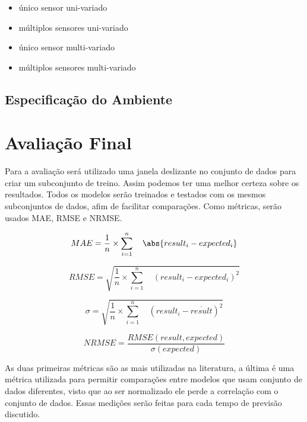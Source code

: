 \begin{itemize}
    \item único sensor uni-variado
    \item múltiplos sensores uni-variado
    \item único sensor multi-variado
    \item múltiplos sensores multi-variado
\end{itemize}

\subsection{Especificação do Ambiente}

\section{Avaliação Final}





Para a avaliação será utilizado uma janela deslizante no conjunto de dados para criar um subconjunto de treino. Assim podemos ter uma melhor certeza sobre os resultados. Todos os modelos serão treinados e testados com os mesmos subconjuntos de dados, afim de facilitar comparações. Como métricas, serão usados MAE, RMSE e NRMSE. 

\begin{equation}
MAE = \frac{1}{n} \times \sum_{i=1}^{n} \quad \abs{result_i - expected_i}
\end{equation}

\begin{equation}
RMSE = \sqrt{ \frac{1}{n} \times \sum_{i=1}^{n} \quad (result_i - expected_i) ^ 2}
\end{equation}

\begin{equation}
\sigma = \sqrt{ \frac{1}{n} \times \sum_{i=1}^{n} \quad (result_i - \overline{result}) ^ 2}
\end{equation}

\begin{equation}
NRMSE = \frac{RMSE(result, expected)}{\sigma(expected)}
\end{equation}

As duas primeiras métricas são as mais utilizadas na literatura, a última é uma métrica utilizada para permitir comparações entre modelos que usam conjunto de dados diferentes, visto que ao ser normalizado ele perde a correlação com o conjunto de dados. Essas medições serão feitas para cada tempo de previsão discutido.
